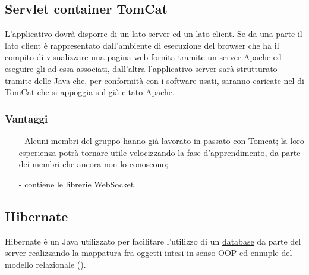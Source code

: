 \subsection{Servlet container TomCat}

L'applicativo dovrà disporre di un lato server ed un lato client. Se da una parte il lato client è rappresentato dall'ambiente di esecuzione del browser che ha il compito di visualizzare una pagina web fornita tramite un server Apache ed eseguire gli  ad essa associati, dall'altra l'applicativo server sarà strutturato tramite delle  Java che, per conformità con i software usati, saranno caricate nel  di TomCat che si appoggia sul già citato Apache.

\subsubsection*{Vantaggi}

\begin{itemize}[noitemsep,nolistsep]
  \item[-] Alcuni membri del gruppo hanno già lavorato in passato con Tomcat; la loro esperienza potrà tornare utile velocizzando la fase d'apprendimento, da parte dei membri che ancora non lo conoscono;
  \item[-] contiene le librerie WebSocket.
\end{itemize}

\subsection{Hibernate}\label{sec:hibernate}

Hibernate è un  Java utilizzato per facilitare l'utilizzo di un \underline{database} da parte del server realizzando la mappatura fra oggetti intesi in senso OOP ed ennuple del modello relazionale ().

